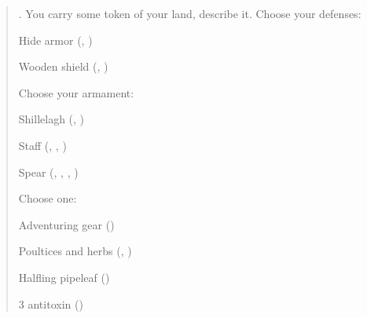 \documentclass[8pt]{extarticle}
\begin{document}
\begin{multicols}{2}

  \begin{quote}
    . You carry some token of your land, describe
    it. Choose your defenses:
    \begin{choices}
    \item Hide armor (, )
    \item Wooden shield (, )
    \end{choices}

    Choose your armament:

    \begin{choices}
    \item Shillelagh (, )
    \item Staff (, , )
    \item Spear (, , ,
      )
    \end{choices}

    Choose one:

    \begin{choices}
    \item Adventuring gear ()
    \item Poultices and herbs (, )
    \item Halfling pipeleaf ()
    \item 3 antitoxin ()
    \end{choices}
\end{quote}

\ 

\columnbreak

\ 

\end{multicols}

\end{document}
